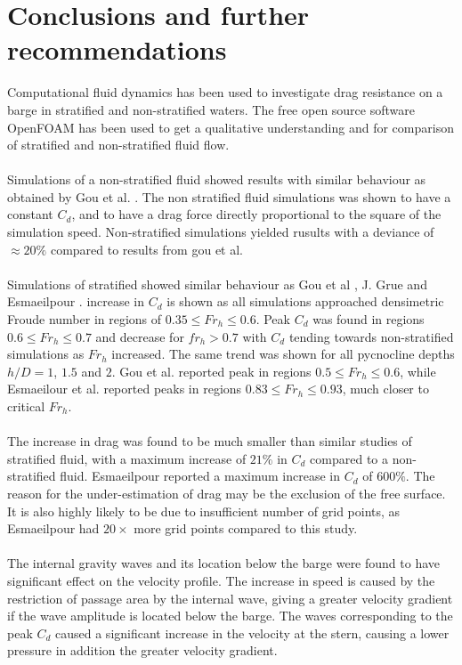 \documentclass[a4paper, 12pt]{report}
\begin{document}
\chapter{Conclusions and further recommendations}
Computational fluid dynamics has been used to investigate drag resistance on a barge in stratified and non-stratified waters. The free open source software OpenFOAM has been used to get a qualitative understanding and for comparison of stratified and non-stratified fluid flow. \\
\\
Simulations of a non-stratified fluid showed results with similar behaviour as obtained by Gou et al. \cite{Gou}. The non stratified fluid simulations was shown to have a constant $C_d$, and to have a drag force directly proportional to the square of the simulation speed. Non-stratified simulations yielded rusults with a deviance of $\approx 20\%$ compared to results from gou et al.\\
\\
Simulations of stratified showed similar behaviour as Gou et al \cite{Gou}, J. Grue \cite{Grue} and Esmaeilpour \cite{Esmaeilpour}.  increase in $C_d$ is shown as all simulations approached densimetric Froude number in regions of $0.35 \leq Fr_h \leq 0.6$. Peak $C_d$ was found in regions $0.6 \leq Fr_h \leq 0.7$ and decrease for $fr_h > 0.7$ with $C_d$ tending towards non-stratified simulations as $Fr_h$ increased. The same trend was shown for all pycnocline depths $h/D=1$, $1.5$ and $2$. Gou et al. reported peak in regions $0.5 \leq Fr_h \leq 0.6$, while Esmaeilour et al. reported peaks in regions $0.83\leq Fr_h \leq 0.93$, much closer to critical $Fr_h$.\\
\\
The increase in drag was found to be much smaller than similar studies of stratified fluid, with a maximum increase of $21\%$ in $C_d$ compared to a non-stratified fluid. Esmaeilpour reported a maximum increase in $C_d$ of $600\%$. The reason for the under-estimation of drag may be the exclusion of the free surface. It is also highly likely to be due to insufficient number of grid points, as Esmaeilpour had $20 \times$ more grid points compared to this study.\\
\\
The internal gravity waves and its location below the barge were found to have significant effect on the velocity profile. The increase in speed is caused by the restriction of passage area by the internal wave, giving a greater velocity gradient if the wave amplitude is located below the barge. The waves corresponding to the peak $C_d$ caused a significant increase in the velocity at the stern, causing a lower pressure in addition the greater velocity gradient. \\
\end{document}
